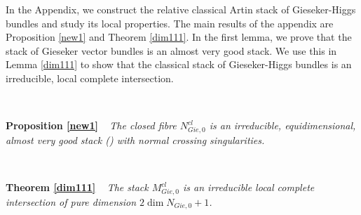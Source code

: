 \documentclass[11pt]{amsart}
\theoremstyle{plain}
\numberwithin{equation}{section}
\theoremstyle{definition}
\theoremstyle{plain}
\begin{document}
In the Appendix, we construct the relative classical Artin stack of Gieseker-Higgs bundles and study its local properties. The main results of the appendix are Proposition \ref{new1} and Theorem \ref{dim111}. In the first lemma, we prove that the stack of Gieseker vector bundles is an almost very good stack. We use this in Lemma \ref{dim111} to show that the classical stack of Gieseker-Higgs bundles is an irreducible, local complete intersection.

\

\noindent
{\bfseries Proposition \ref{new1}} \ {\em
The closed fibre $N^{cl}_{Gie,0}$ is an irreducible, equidimensional, almost very good stack (\cite[Definition 2.1.2]{32e}) with normal crossing singularities.
}

\

\noindent
{\bfseries Theorem \ref{dim111}} \ {\em
The stack $M^{cl}_{Gie,0}$ is an irreducible local complete intersection of pure dimension $2\dim N_{Gie,0} + 1$.
}

\
\end{document}
